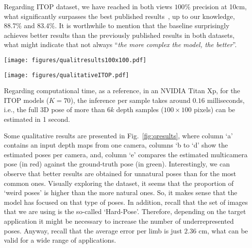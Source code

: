 \documentclass[review,12pt,3p]{elsarticle}
\begin{document}
Regarding ITOP dataset, we have reached in both views $100\%$ precision at 10cm, what significantly surpasses the best published results~\cite{moon2018cvpr}, up to our knowledge, 88.7\% and 83.4\%.
%
It is worthwhile to mention that the baseline surprisingly achieves better results than the previously published results in both datasets, what might indicate that not always ``\textit{the more complex the model, the better}''.


\begin{figure*}[p]
\centering
   \texttt{[image: figures/qualitresults100x100.pdf]}
   \caption{\textbf{Qualitative results on UBC3V}.
   \textbf{Top block}: successful cases (green rectangle). \textbf{Bottom block}: failure cases (red rectangle). Columns: (a) depth map from one camera; (b) Camera 1; (c) Camera 2; (d) Camera 3; (e) Multicamera pose (red) vs ground-truth (green). 
   Best viewed in color.
   }
   \label{fig:qresults}
\end{figure*}

\begin{figure*}[p]
\centering
   \texttt{[image: figures/qualitativeITOP.pdf]}
   \caption{\textbf{Qualitative results on ITOP}.
   \textbf{Left block}: cases with low error. \textbf{Right block}: cases with higher error. Columns (from left to right): frontal  viewpoint depth map; top viewpoint depth map; and, estimated pose (blue) vs ground-truth (green). 
   Best viewed in digital format (zoom-in to find the  ``errorneous'' estimations).
   }
   \label{fig:qresultsITOP}
\end{figure*}

Regarding computational time, as a reference, in an  NVIDIA Titan Xp, for the ITOP models ($K=70$), the inference per sample takes around $0.16$ milliseconds, i.e., the full 3D pose of more than 6$k$ depth samples ($100\times100$ pixels) can be estimated in 1 second.


Some qualitative results are presented in Fig.~\ref{fig:qresults}, where column `a' contains an input depth maps from one camera, columns `b to `d' show the estimated poses per camera, and, column `e' compares the estimated multicamera pose (in red) against the ground-truth pose (in green).
Interestingly, we can observe that better results are obtained for unnatural poses than for the most common ones. Visually exploring the dataset, it seems that the proportion of `weird poses' is higher than the more natural ones. So, it makes sense that the model has focused on that type of poses. In addition, recall that the set of images that we are using is the so-called `Hard-Pose'. Therefore, depending on the target application it might be necessary to increase the number of underrepresented poses. Anyway, recall that the average error per limb is just $2.36$ cm, what can be valid for a wide range of applications.
\end{document}
